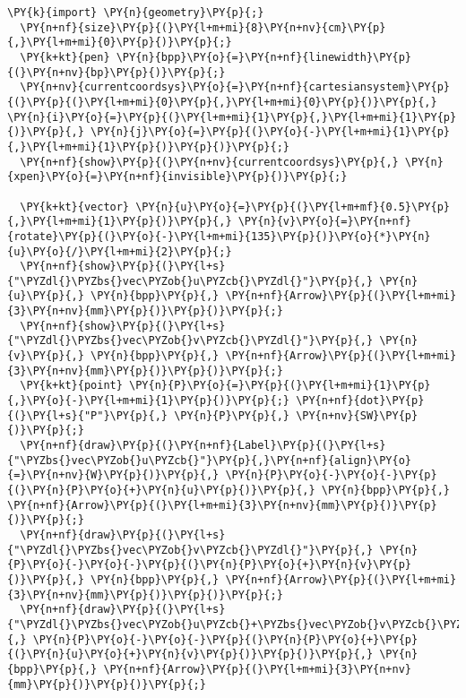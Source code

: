 \begin{Verbatim}[commandchars=\\\{\}]
  \PY{k}{import} \PY{n}{geometry}\PY{p}{;}
  \PY{n+nf}{size}\PY{p}{(}\PY{l+m+mi}{8}\PY{n+nv}{cm}\PY{p}{,}\PY{l+m+mi}{0}\PY{p}{)}\PY{p}{;}
  \PY{k+kt}{pen} \PY{n}{bpp}\PY{o}{=}\PY{n+nf}{linewidth}\PY{p}{(}\PY{n+nv}{bp}\PY{p}{)}\PY{p}{;}
  \PY{n+nv}{currentcoordsys}\PY{o}{=}\PY{n+nf}{cartesiansystem}\PY{p}{(}\PY{p}{(}\PY{l+m+mi}{0}\PY{p}{,}\PY{l+m+mi}{0}\PY{p}{)}\PY{p}{,} \PY{n}{i}\PY{o}{=}\PY{p}{(}\PY{l+m+mi}{1}\PY{p}{,}\PY{l+m+mi}{1}\PY{p}{)}\PY{p}{,} \PY{n}{j}\PY{o}{=}\PY{p}{(}\PY{o}{-}\PY{l+m+mi}{1}\PY{p}{,}\PY{l+m+mi}{1}\PY{p}{)}\PY{p}{)}\PY{p}{;}
  \PY{n+nf}{show}\PY{p}{(}\PY{n+nv}{currentcoordsys}\PY{p}{,} \PY{n}{xpen}\PY{o}{=}\PY{n+nf}{invisible}\PY{p}{)}\PY{p}{;}

  \PY{k+kt}{vector} \PY{n}{u}\PY{o}{=}\PY{p}{(}\PY{l+m+mf}{0.5}\PY{p}{,}\PY{l+m+mi}{1}\PY{p}{)}\PY{p}{,} \PY{n}{v}\PY{o}{=}\PY{n+nf}{rotate}\PY{p}{(}\PY{o}{-}\PY{l+m+mi}{135}\PY{p}{)}\PY{o}{*}\PY{n}{u}\PY{o}{/}\PY{l+m+mi}{2}\PY{p}{;}
  \PY{n+nf}{show}\PY{p}{(}\PY{l+s}{"\PYZdl{}\PYZbs{}vec\PYZob{}u\PYZcb{}\PYZdl{}"}\PY{p}{,} \PY{n}{u}\PY{p}{,} \PY{n}{bpp}\PY{p}{,} \PY{n+nf}{Arrow}\PY{p}{(}\PY{l+m+mi}{3}\PY{n+nv}{mm}\PY{p}{)}\PY{p}{)}\PY{p}{;}
  \PY{n+nf}{show}\PY{p}{(}\PY{l+s}{"\PYZdl{}\PYZbs{}vec\PYZob{}v\PYZcb{}\PYZdl{}"}\PY{p}{,} \PY{n}{v}\PY{p}{,} \PY{n}{bpp}\PY{p}{,} \PY{n+nf}{Arrow}\PY{p}{(}\PY{l+m+mi}{3}\PY{n+nv}{mm}\PY{p}{)}\PY{p}{)}\PY{p}{;}
  \PY{k+kt}{point} \PY{n}{P}\PY{o}{=}\PY{p}{(}\PY{l+m+mi}{1}\PY{p}{,}\PY{o}{-}\PY{l+m+mi}{1}\PY{p}{)}\PY{p}{;} \PY{n+nf}{dot}\PY{p}{(}\PY{l+s}{"P"}\PY{p}{,} \PY{n}{P}\PY{p}{,} \PY{n+nv}{SW}\PY{p}{)}\PY{p}{;}
  \PY{n+nf}{draw}\PY{p}{(}\PY{n+nf}{Label}\PY{p}{(}\PY{l+s}{"\PYZbs{}vec\PYZob{}u\PYZcb{}"}\PY{p}{,}\PY{n+nf}{align}\PY{o}{=}\PY{n+nv}{W}\PY{p}{)}\PY{p}{,} \PY{n}{P}\PY{o}{-}\PY{o}{-}\PY{p}{(}\PY{n}{P}\PY{o}{+}\PY{n}{u}\PY{p}{)}\PY{p}{,} \PY{n}{bpp}\PY{p}{,} \PY{n+nf}{Arrow}\PY{p}{(}\PY{l+m+mi}{3}\PY{n+nv}{mm}\PY{p}{)}\PY{p}{)}\PY{p}{;}
  \PY{n+nf}{draw}\PY{p}{(}\PY{l+s}{"\PYZdl{}\PYZbs{}vec\PYZob{}v\PYZcb{}\PYZdl{}"}\PY{p}{,} \PY{n}{P}\PY{o}{-}\PY{o}{-}\PY{p}{(}\PY{n}{P}\PY{o}{+}\PY{n}{v}\PY{p}{)}\PY{p}{,} \PY{n}{bpp}\PY{p}{,} \PY{n+nf}{Arrow}\PY{p}{(}\PY{l+m+mi}{3}\PY{n+nv}{mm}\PY{p}{)}\PY{p}{)}\PY{p}{;}
  \PY{n+nf}{draw}\PY{p}{(}\PY{l+s}{"\PYZdl{}\PYZbs{}vec\PYZob{}u\PYZcb{}+\PYZbs{}vec\PYZob{}v\PYZcb{}\PYZdl{}"}\PY{p}{,} \PY{n}{P}\PY{o}{-}\PY{o}{-}\PY{p}{(}\PY{n}{P}\PY{o}{+}\PY{p}{(}\PY{n}{u}\PY{o}{+}\PY{n}{v}\PY{p}{)}\PY{p}{)}\PY{p}{,} \PY{n}{bpp}\PY{p}{,} \PY{n+nf}{Arrow}\PY{p}{(}\PY{l+m+mi}{3}\PY{n+nv}{mm}\PY{p}{)}\PY{p}{)}\PY{p}{;}
\end{Verbatim}

